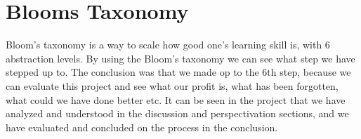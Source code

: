\section{Blooms Taxonomy}
Bloom's taxonomy is a way to scale how good one's learning skill is, with 6 abstraction levels.
By using the Bloom's taxonomy we can see what step we have stepped up to. The conclusion was that we made op to the 6th step, because we can evaluate this project and see what our profit is, what has been forgotten, what could we have done better etc. It can be seen in the project that we have analyzed and understood in the discussion and perspectivation sections, and we have evaluated and concluded on the process in the conclusion.